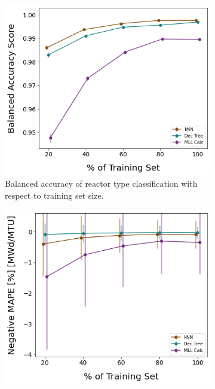 \begin{figure}[!htb]
    \centering
    \begin{subfigure}[b]{0.49\textwidth}
        \centering
        \includegraphics[width=\textwidth]{./chapters/exp1/learncurve_nuc29_BalAcc_rxtr.png}
        \caption{Balanced accuracy of reactor type classification with respect 
                 to training set size.}
        \label{fig:learnsA}
    \end{subfigure}
    \hfill
    \begin{subfigure}[b]{0.49\textwidth}
        \centering
        \includegraphics[width=\textwidth]{./chapters/exp1/learncurve_nuc29_MAPE_burn.png}

\end{subfigure}
\end{figure}
